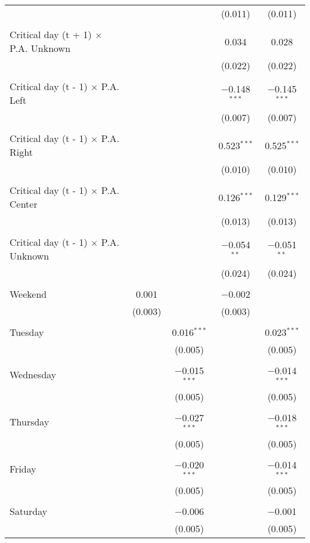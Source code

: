 \documentclass[
]{article}
\begin{document}
\begin{table}[!htbp]
{\begin{tabular}{@{\extracolsep{5pt}}lcccc}
  &  &  & (0.011) & (0.011) \\ 
  & & & & \\ 
 Critical day (t + 1) $\times$ P.A. Unknown &  &  & 0.034 & 0.028 \\ 
  &  &  & (0.022) & (0.022) \\ 
  & & & & \\ 
 Critical day (t - 1) $\times$ P.A. Left &  &  & $-$0.148$^{***}$ & $-$0.145$^{***}$ \\ 
  &  &  & (0.007) & (0.007) \\ 
  & & & & \\ 
 Critical day (t - 1) $\times$ P.A. Right &  &  & 0.523$^{***}$ & 0.525$^{***}$ \\ 
  &  &  & (0.010) & (0.010) \\ 
  & & & & \\ 
 Critical day (t - 1) $\times$ P.A. Center &  &  & 0.126$^{***}$ & 0.129$^{***}$ \\ 
  &  &  & (0.013) & (0.013) \\ 
  & & & & \\ 
 Critical day (t - 1) $\times$ P.A. Unknown &  &  & $-$0.054$^{**}$ & $-$0.051$^{**}$ \\ 
  &  &  & (0.024) & (0.024) \\ 
  & & & & \\ 
 Weekend & 0.001 &  & $-$0.002 &  \\ 
  & (0.003) &  & (0.003) &  \\ 
  & & & & \\ 
 Tuesday &  & 0.016$^{***}$ &  & 0.023$^{***}$ \\ 
  &  & (0.005) &  & (0.005) \\ 
  & & & & \\ 
 Wednesday &  & $-$0.015$^{***}$ &  & $-$0.014$^{***}$ \\ 
  &  & (0.005) &  & (0.005) \\ 
  & & & & \\ 
 Thursday &  & $-$0.027$^{***}$ &  & $-$0.018$^{***}$ \\ 
  &  & (0.005) &  & (0.005) \\ 
  & & & & \\ 
 Friday &  & $-$0.020$^{***}$ &  & $-$0.014$^{***}$ \\ 
  &  & (0.005) &  & (0.005) \\ 
  & & & & \\ 
 Saturday &  & $-$0.006 &  & $-$0.001 \\ 
  &  & (0.005) &  & (0.005) \\ 

\end{tabular}}
\end{table}
\end{document}
